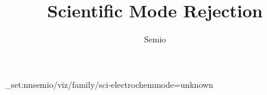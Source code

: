 \documentclass[type=paper,language=de,theme=dark]{semio}
\title{Scientific Mode Rejection}
\author{Semio}
\date{}
\begin{document}
\SemioVizProbePage
\ExplSyntaxOn\keys_set:nn{semio/viz/family/sci-electrochem}{mode=unknown}\ExplSyntaxOff
{}
\SemioVizProbeEnd
\end{document}
